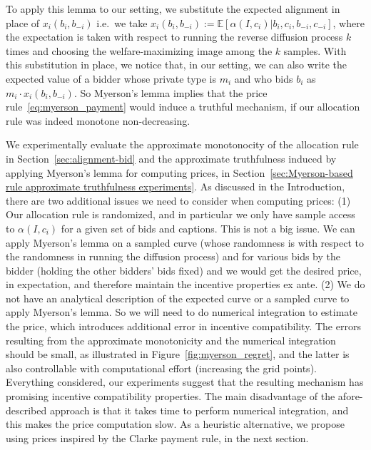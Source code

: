 \documentclass[format=acmsmall, review=false]{acmart}
\begin{document}
To apply this lemma to our setting, we substitute the expected alignment in place of $x_i(b_i,b_{-i})$ i.e.~we take $x_i(b_i,b_{-i}):=\mathbb{E}\left[\alpha(I,c_i)|b_i,c_i,b_{-i},c_{-i}\right]$, where the expectation is taken with respect to running the reverse diffusion process $k$ times and choosing the welfare-maximizing image among the $k$ samples. With this substitution in place, we  notice that, in our setting, we can also write the expected value of a bidder whose private type is $m_i$ and who bids $b_i$ as $m_i \cdot x_i(b_i,b_{-i})$. So Myerson's lemma implies that the price rule~\eqref{eq:myerson_payment} would induce a truthful mechanism, if our allocation rule was indeed monotone non-decreasing. 

We experimentally evaluate the approximate monotonocity of the allocation rule in Section~\ref{sec:alignment-bid} and the approximate truthfulness induced by applying Myerson's lemma for computing prices, in Section~\ref{sec:Myerson-based rule approximate truthfulness experiments}.  As discussed in the Introduction, there are two additional issues we need to consider when computing prices: (1) Our allocation rule is randomized, and in particular we only have sample access to $\alpha(I,c_i)$ for a given set of bids and captions. This is not a big issue. We can apply Myerson's lemma on a sampled curve (whose randomness is with respect to the randomness in running the diffusion process) and for various bids by the bidder (holding the other bidders' bids fixed) and we would get the desired price, in expectation, and therefore maintain the incentive properties ex ante. (2) We do not have an analytical description of the expected curve or a sampled curve to apply Myerson's lemma.  So we will need to do numerical integration to estimate the price, which introduces additional error in incentive compatibility. The errors resulting from the approximate monotonicity and the numerical integration should be small, as illustrated in Figure~\ref{fig:myerson_regret}, and the latter is also controllable with computational effort (increasing the grid points). Everything considered, our experiments suggest that the resulting mechanism has promising incentive compatibility properties. The main disadvantage of the afore-described approach is that it takes time to perform numerical integration, and this  makes the price computation slow. As a heuristic alternative, we propose using prices inspired by the Clarke payment rule, in the next section.
\end{document}
